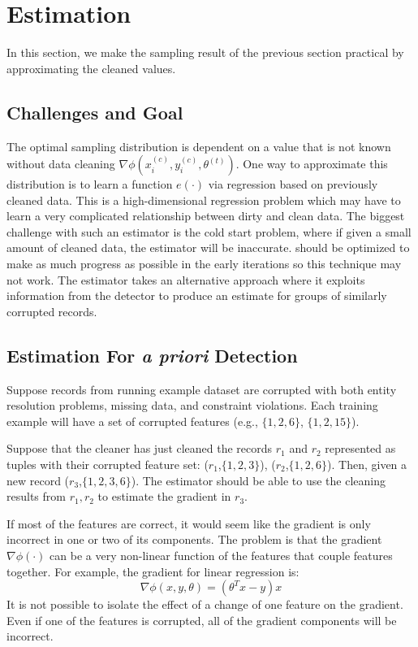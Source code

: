 \section{Estimation}\label{sampling}
In this section, we make the sampling result of the previous section practical by approximating the cleaned values.

\subsection{Challenges and Goal}
The optimal sampling distribution is dependent on a value that is not known without data cleaning $\nabla\phi(x^{(c)}_i,y^{(c)}_i,\theta^{(t)})$.
One way to approximate this distribution is to learn a function $e(\cdot)$ via regression based on previously cleaned data.
This is a high-dimensional regression problem which may have to learn a very complicated relationship between dirty and clean data.
The biggest challenge with such an estimator is the cold start problem, where if given a small amount of cleaned data, the estimator will be inaccurate.
\sys should be optimized to make as much progress as possible in the early iterations so this technique may not work.
The estimator takes an alternative approach where it exploits information from the detector to produce an estimate for groups of similarly corrupted records.

\subsection{Estimation For \emph{a priori} Detection}
\begin{example}
Suppose records from running example dataset are corrupted with both entity resolution problems, missing data, and constraint violations. 
Each training example will have a set of corrupted features (e.g., $\{1,2,6\}$, $\{1,2,15\}$).

Suppose that the cleaner has just cleaned the records $r_1$ and $r_2$ represented as tuples with their corrupted feature set: ($r_1$,$\{1,2,3\}$), ($r_2$,$\{1,2,6\}$).
Then, given a new record ($r_3$,$\{1,2,3,6\}$). 
The estimator should be able to use the cleaning results from $r_1,r_2$ to estimate the gradient in $r_3$.
\end{example}

If most of the features are correct, it would seem like the gradient is only
incorrect in one or two of its components.
The problem is that the gradient $\nabla\phi(\cdot)$ can be a very non-linear function of the features that couple features together.
For example, the gradient for linear regression is:
\[
\nabla\phi(x,y,\theta) = (\theta^Tx - y)x
\]
It is not possible to isolate the effect of a change of one feature on the gradient.
Even if one of the features is corrupted, all of the gradient components will be incorrect.


